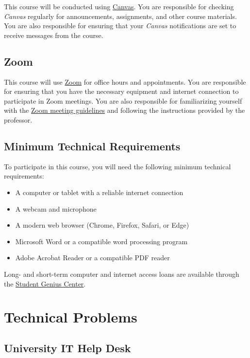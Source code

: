 \documentclass[12pt, letterpaper]{article}
\begin{document}
This course will be conducted using \href{https://csufullerton.instructure.com/}{Canvas}. You are responsible for checking \emph{Canvas} regularly for announcements, assignments, and other course materials. You are also responsible for ensuring that your \emph{Canvas} notifications are set to receive messages from the course. 

\subsection*{Zoom}
This course will use \href{https://fullerton.zoom.us/}{Zoom} for office hours and appointments. You are responsible for ensuring that you have the necessary equipment and internet connection to participate in Zoom meetings. You are also responsible for familiarizing yourself with the \href{https://support.zoom.us/hc/en-us/articles/201362193-Joining-a-Meeting}{Zoom meeting guidelines} and following the instructions provided by the professor.

\subsection*{Minimum Technical Requirements}

To participate in this course, you will need the following minimum technical requirements:
\begin{itemize}
    \item A computer or tablet with a reliable internet connection
    \item A webcam and microphone
    \item A modern web browser (Chrome, Firefox, Safari, or Edge)
    \item Microsoft Word or a compatible word processing program
    \item Adobe Acrobat Reader or a compatible PDF reader
\end{itemize}

\noindent Long- and short-term computer and internet access loans are available through the \href{http://www.fullerton.edu/it/students/sgc/index.php}{Student Genius Center}.

\section{Technical Problems}

\subsection*{University IT Help Desk}
\end{document}

